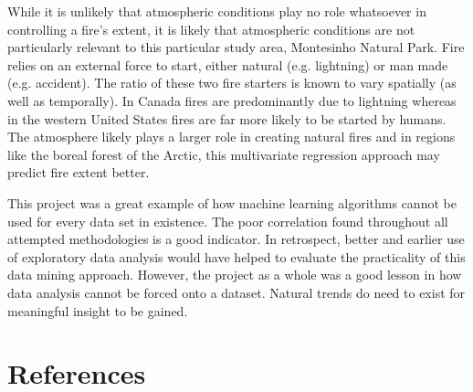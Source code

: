 \documentclass{article}
\begin{document}
While it is unlikely that atmospheric conditions play no role whatsoever in controlling a fire’s extent, it is likely that atmospheric conditions are not particularly relevant to this particular study area, Montesinho Natural Park. Fire relies on an external force to start, either natural (e.g. lightning) or man made (e.g. accident). The ratio of these two fire starters is known to vary spatially (as well as temporally). In Canada fires are predominantly due to lightning whereas in the western United States fires are far more likely to be started by humans. The atmosphere likely plays a larger role in creating natural fires and in regions like the boreal forest of the Arctic, this multivariate regression approach may predict fire extent better.

This project was a great example of how machine learning algorithms cannot be used for every data set in existence. The poor correlation found throughout all attempted methodologies is a good indicator. In retrospect, better and earlier use of exploratory data analysis would have helped to evaluate the practicality of this data mining approach. However, the project as a whole was a good lesson in how data analysis cannot be forced onto a dataset. Natural trends do need to exist for meaningful insight to be gained.

\section{References}
\end{document}
